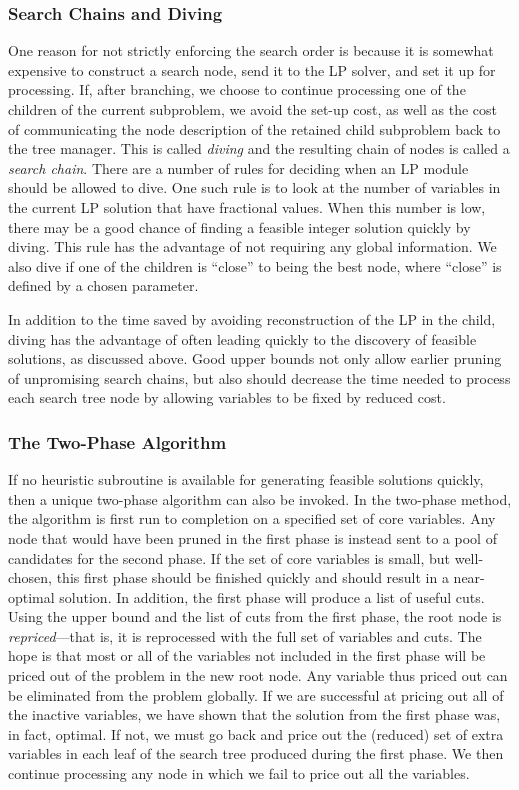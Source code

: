 \subsubsection{Search Chains and Diving}

One reason for not strictly enforcing the search order is because it
is somewhat expensive to construct a search node, send it to the LP
solver, and set it up for processing. If, after branching, we choose
to continue processing one of the children of the current subproblem,
we avoid the set-up cost, as well as the cost of communicating the
node description of the retained child subproblem back to the tree
manager. This is called {\em diving} and the resulting chain of nodes
is called a {\em search chain}. There are a number of rules for
deciding when an LP module should be allowed to dive. One such rule is
to look at the number of variables in the current LP solution that
have fractional values. When this number is low, there may be a good
chance of finding a feasible integer solution quickly by diving. This
rule has the advantage of not requiring any global information. We
also dive if one of the children is ``close'' to being the best node,
where ``close'' is defined by a chosen parameter.

In addition to the time saved by avoiding reconstruction of the LP in
the child, diving has the advantage of often leading quickly to the
discovery of feasible solutions, as discussed above. Good upper bounds
not only allow earlier pruning of unpromising search chains, but also
should decrease the time needed to process each search tree node by
allowing variables to be fixed by reduced cost.

\subsubsection{The Two-Phase Algorithm}
\label{two-phase}

If no heuristic subroutine is available for generating feasible
solutions quickly, then a unique two-phase algorithm can also be
invoked. In the two-phase method, the algorithm is first run to
completion on a specified set of core variables. Any node that would
have been pruned in the first phase is instead sent to a pool of
candidates for the second phase. If the set of core variables is
small, but well-chosen, this first phase should be finished quickly
and should result in a near-optimal solution. In addition, the first
phase will produce a list of useful cuts. Using the upper bound and
the list of cuts from the first phase, the root node is {\em
repriced}---that is, it is reprocessed with the full set of variables
and cuts. The hope is that most or all of the variables not included
in the first phase will be priced out of the problem in the new root
node. Any variable thus priced out can be eliminated from the problem
globally. If we are successful at pricing out all of the inactive
variables, we have shown that the solution from the first phase was,
in fact, optimal. If not, we must go back and price out the (reduced)
set of extra variables in each leaf of the search tree produced during
the first phase. We then continue processing any node in which we fail
to price out all the variables.

